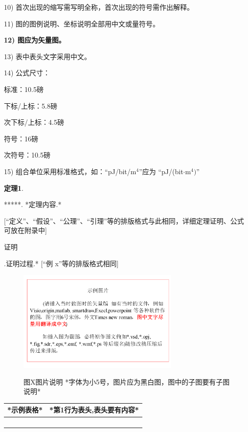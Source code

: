 \documentclass[10.5pt,compsoc]{CjC}
\theoremstyle{mystyle}
\begin{document}
\begin{CJK*}{UTF8}{song}
10) 首次出现的缩写需写明全称，首次出现的符号需作出解释。

11) 图的图例说明、坐标说明全部用中文或量符号。

\textbf{12) 图应为矢量图。}

13) 表中表头文字采用中文。

14) 公式尺寸：

标准：10.5磅

下标/上标：5.8磅

次下标/上标：4.5磅

符号：16磅

次符号：10.5磅

15) 组合单位采用标准格式，如：``pJ/bit/m$^{4}$''应为 ``pJ/(bit$\cdot
$m$^{4})$''

{\begin{CJK*}{UTF8}{zhhei}\textbf{定理1}.\end{CJK*}}\quad ******. *定理内容.*

[``定义''、``假设''、``公理''、``引理''等的排版格式与此相同，详细定理证明、公式可放在附录中]

{\begin{CJK*}{UTF8}{song}证明\end{CJK*}}.\quad  *证明过程.* [``例 x''等的排版格式相同]


\begin{figure}[htbp]
\centerline{\includegraphics[width=3.15in,height=1.98in]{CJC1.pdf}}
图X\quad  图片说明 *字体为小5号，图片应为黑白图，图中的子图要有子图说明*
\label{fig1}
\end{figure}

\begin{table}[htbp]
\vspace {-2.5mm}
\begin{center}
\begin{tabular}{ll}
\toprule
*示例表格*&*第1行为表头,表头要有内容* \\
\hline
&
 \\
&
 \\
&
 \\
&
 \\
\bottomrule
\end{tabular}
\label{tab1}
\end{center}
\end{table}


\end{CJK*}
\end{document}
